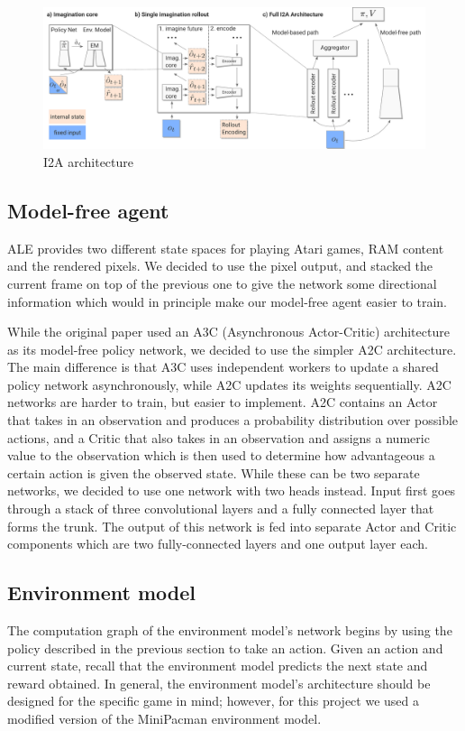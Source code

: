 \documentclass[10pt, twocolumn]{article}
\begin{document}
\begin{figure}
\centering
\includegraphics[scale=0.3]{i2a}
\caption{I2A architecture}
\end{figure}

\subsection{Model-free agent}
ALE provides two different state spaces for playing Atari games, RAM content and the rendered pixels. We decided to use the pixel output, and stacked the current frame on top of the previous one to give the network some directional information which would in principle make our model-free agent easier to train.

While the original paper used an A3C (Asynchronous Actor-Critic) architecture as its model-free policy network, we decided to use the simpler A2C architecture.
The main difference is that A3C uses independent workers to update a shared policy network asynchronously, while A2C updates its weights sequentially.
A2C networks are harder to train, but easier to implement.
A2C contains an Actor that takes in an observation and produces a probability distribution over possible actions, and a Critic that also takes in an observation and assigns a numeric value to the observation which is then used to determine how advantageous a certain action is given the observed state.
While these can be two separate networks, we decided to use one network with two heads instead.
Input first goes through a stack of three convolutional layers and a fully connected layer that forms the trunk.
The output of this network is fed into separate Actor and Critic components which are two fully-connected layers and one output layer each.

\subsection{Environment model}

The computation graph of the environment model's network begins by using the policy described in the
previous section to take an action. Given an action and current state, recall that the environment model
predicts the next state and reward obtained. In general, the environment model's architecture should be
designed for the specific game in mind; however, for this project we used a modified version of the
MiniPacman environment model.
\end{document}
